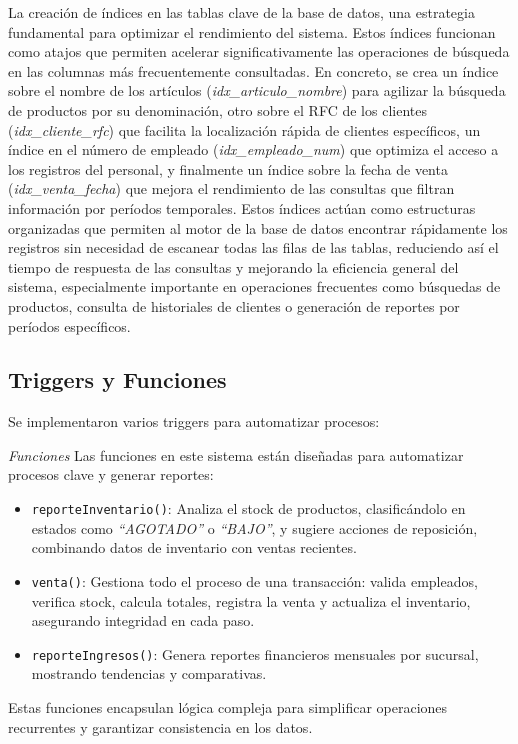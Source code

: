 \documentclass[a4paper, 12pt]{article}
\begin{document}
La creación de índices en las tablas clave de la base de datos, una estrategia fundamental para optimizar el rendimiento del sistema. 
Estos índices funcionan como atajos que permiten acelerar significativamente las operaciones de búsqueda en las columnas más frecuentemente consultadas. 
En concreto, se crea un índice sobre el nombre de los artículos (\textit{idx\_articulo\_nombre}) para agilizar la búsqueda de productos por su denominación, otro sobre el RFC de los clientes (\textit{idx\_cliente\_rfc}) que facilita la localización rápida de clientes específicos, 
un índice en el número de empleado (\textit{idx\_empleado\_num}) que optimiza el acceso a los registros del personal, y finalmente un índice sobre la fecha de venta (\textit{idx\_venta\_fecha}) que mejora el rendimiento de las consultas que filtran información por períodos temporales. 
Estos índices actúan como estructuras organizadas que permiten al motor de la base de datos encontrar rápidamente los registros sin necesidad de escanear todas las filas de las tablas, reduciendo así el tiempo de respuesta de las consultas y mejorando la eficiencia general del sistema, 
especialmente importante en operaciones frecuentes como búsquedas de productos, consulta de historiales de clientes o generación de reportes por períodos específicos.


\subsection{Triggers y Funciones}

Se implementaron varios triggers para automatizar procesos:


\textit{Funciones}
Las funciones  en este sistema están diseñadas para automatizar procesos clave y generar reportes:
\begin{itemize}
    \item \texttt{reporteInventario()}: Analiza el stock de productos, clasificándolo en estados como \textit{``AGOTADO''} o \textit{``BAJO''}, y sugiere acciones de reposición, combinando datos de inventario con ventas recientes.
    
    \item \texttt{venta()}: Gestiona todo el proceso de una transacción: valida empleados, verifica stock, calcula totales, registra la venta y actualiza el inventario, asegurando integridad en cada paso.
    
    \item \texttt{reporteIngresos()}: Genera reportes financieros mensuales por sucursal, mostrando tendencias y comparativas. 
\end{itemize}
Estas funciones encapsulan lógica compleja para simplificar operaciones recurrentes y garantizar consistencia en los datos.
\end{document}
